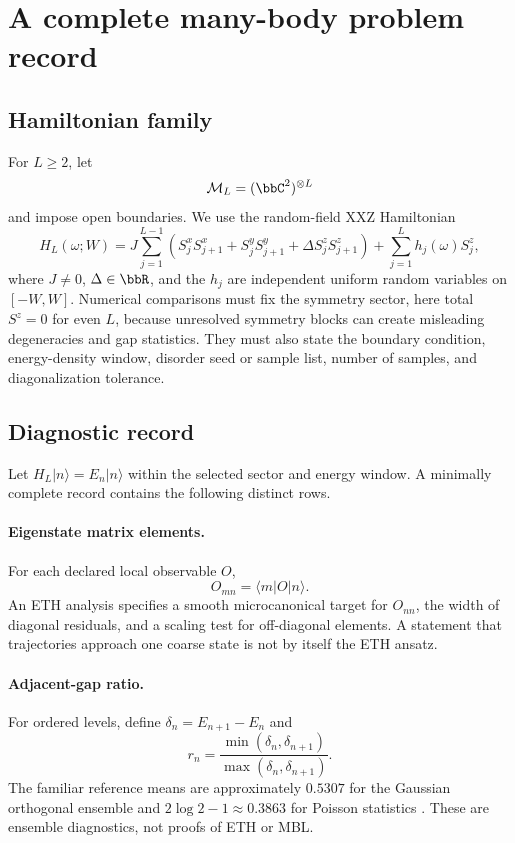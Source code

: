 \documentclass[11pt]{article}
\newcommand{\Micro}{\mathcal M}
\begin{document}
\section{A complete many-body problem record}

\subsection{Hamiltonian family}

For $L\geq 2$, let
\[
 \Micro_L=(\bbC^2)^{\otimes L}
\]
and impose open boundaries.  We use the random-field XXZ Hamiltonian
\begin{equation}\label{eq:xxz}
 H_L(\omega;W)
 =
 J\sum_{j=1}^{L-1}
 \left(
 S_j^xS_{j+1}^x+S_j^yS_{j+1}^y+
 \Delta S_j^zS_{j+1}^z
 \right)
 +\sum_{j=1}^{L}h_j(\omega)S_j^z ,
\end{equation}
where $J\neq0$, $\Delta\in\bbR$, and the $h_j$ are independent uniform
random variables on $[-W,W]$.  Numerical comparisons must fix the
symmetry sector, here total $S^z=0$ for even $L$, because unresolved
symmetry blocks can create misleading degeneracies and gap statistics.
They must also state the boundary condition, energy-density window,
disorder seed or sample list, number of samples, and diagonalization
tolerance.

\subsection{Diagnostic record}

Let $H_L|n\rangle=E_n|n\rangle$ within the selected sector and energy
window.  A minimally complete record contains the following distinct
rows.

\paragraph{Eigenstate matrix elements.}
For each declared local observable $O$,
\begin{equation}\label{eq:eth-matrix}
 O_{mn}=\langle m|O|n\rangle .
\end{equation}
An ETH analysis specifies a smooth microcanonical target for $O_{nn}$,
the width of diagonal residuals, and a scaling test for off-diagonal
elements.  A statement that trajectories approach one coarse state is
not by itself the ETH ansatz.

\paragraph{Adjacent-gap ratio.}
For ordered levels, define $\delta_n=E_{n+1}-E_n$ and
\begin{equation}\label{eq:ratio}
 r_n=\frac{\min(\delta_n,\delta_{n+1})}
 {\max(\delta_n,\delta_{n+1})}.
\end{equation}
The familiar reference means are approximately $0.5307$ for the
Gaussian orthogonal ensemble and $2\log 2-1\approx0.3863$ for Poisson
statistics \cite{oganesyan2007,pal2010}.  These are ensemble diagnostics,
not proofs of ETH or MBL.
\end{document}
